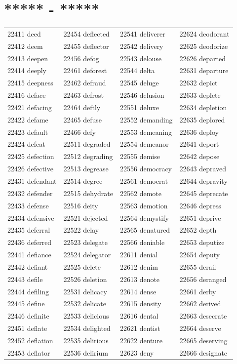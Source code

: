 \documentclass[10pt, oneside]{book}
\begin{document}
\begin{table}
	\centering
	\section*{***** - *****}
	\begin{tabular}{l l l l}
22411 deed &22454 deflected &22541 deliverer &22624 deodorant\\
22412 deem &22455 deflector &22542 delivery &22625 deodorize\\
22413 deepen &22456 defog &22543 delouse &22626 departed\\
22414 deeply &22461 deforest &22544 delta &22631 departure\\
22415 deepness &22462 defraud &22545 deluge &22632 depict\\
22416 deface &22463 defrost &22546 delusion &22633 deplete\\
22421 defacing &22464 deftly &22551 deluxe &22634 depletion\\
22422 defame &22465 defuse &22552 demanding &22635 deplored\\
22423 default &22466 defy &22553 demeaning &22636 deploy\\
22424 defeat &22511 degraded &22554 demeanor &22641 deport\\
22425 defection &22512 degrading &22555 demise &22642 depose\\
22426 defective &22513 degrease &22556 democracy &22643 depraved\\
22431 defendant &22514 degree &22561 democrat &22644 depravity\\
22432 defender &22515 dehydrate &22562 demote &22645 deprecate\\
22433 defense &22516 deity &22563 demotion &22646 depress\\
22434 defensive &22521 dejected &22564 demystify &22651 deprive\\
22435 deferral &22522 delay &22565 denatured &22652 depth\\
22436 deferred &22523 delegate &22566 deniable &22653 deputize\\
22441 defiance &22524 delegator &22611 denial &22654 deputy\\
22442 defiant &22525 delete &22612 denim &22655 derail\\
22443 defile &22526 deletion &22613 denote &22656 deranged\\
22444 defiling &22531 delicacy &22614 dense &22661 derby\\
22445 define &22532 delicate &22615 density &22662 derived\\
22446 definite &22533 delicious &22616 dental &22663 desecrate\\
22451 deflate &22534 delighted &22621 dentist &22664 deserve\\
22452 deflation &22535 delirious &22622 denture &22665 deserving\\
22453 deflator &22536 delirium &22623 deny &22666 designate\\
	\end{tabular}
 \end{table}
\end{document}
